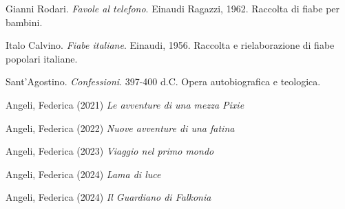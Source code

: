 Gianni Rodari.
\textit{Favole al telefono}.
Einaudi Ragazzi, 1962.
Raccolta di fiabe per bambini.

Italo Calvino.
\textit{Fiabe italiane}.
Einaudi, 1956.
Raccolta e rielaborazione di fiabe popolari italiane.

Sant'Agostino.
\textit{Confessioni}.
397-400 d.C.
Opera autobiografica e teologica.

Angeli, Federica (2021)
\textit{Le avventure di una mezza Pixie}

Angeli, Federica (2022)
\textit{Nuove avventure di una fatina}

Angeli, Federica (2023)
\textit{Viaggio nel primo mondo}

Angeli, Federica (2024)
\textit{Lama di luce}

Angeli, Federica (2024)
\textit{Il Guardiano di Falkonia}
